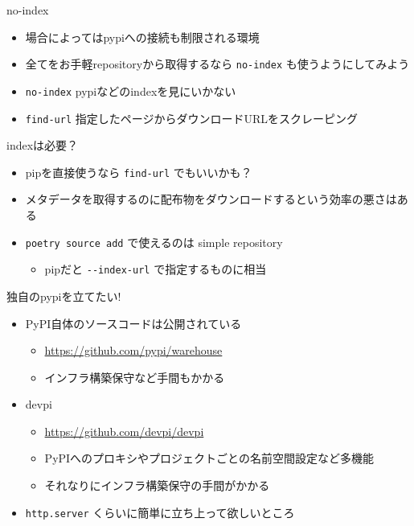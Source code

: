 \documentclass[presentation]{beamer}
\begin{document}
\begin{frame}[label={sec:org73d1d4c},fragile]{no-index}
 \begin{itemize}
\item 場合によってはpypiへの接続も制限される環境
\item 全てをお手軽repositoryから取得するなら \texttt{no-index} も使うようにしてみよう

\item \texttt{no-index} pypiなどのindexを見にいかない
\item \texttt{find-url} 指定したページからダウンロードURLをスクレーピング
\end{itemize}
\end{frame}

\begin{frame}[label={sec:orga9158fc},fragile]{indexは必要？}
 \begin{itemize}
\item pipを直接使うなら \texttt{find-url} でもいいかも？
\item メタデータを取得するのに配布物をダウンロードするという効率の悪さはある
\item \texttt{poetry source add} で使えるのは simple repository
\begin{itemize}
\item pipだと \texttt{-{}-{}index-url} で指定するものに相当
\end{itemize}
\end{itemize}
\end{frame}

\begin{frame}[label={sec:orgf58dcec},fragile]{独自のpypiを立てたい!}
 \begin{itemize}
\item PyPI自体のソースコードは公開されている
\begin{itemize}
\item \url{https://github.com/pypi/warehouse}
\item インフラ構築保守など手間もかかる
\end{itemize}
\item devpi
\begin{itemize}
\item \url{https://github.com/devpi/devpi}
\item PyPIへのプロキシやプロジェクトごとの名前空間設定など多機能
\item それなりにインフラ構築保守の手間がかかる
\end{itemize}
\item \texttt{http.server} くらいに簡単に立ち上って欲しいところ
\end{itemize}
\end{frame}
\end{document}
